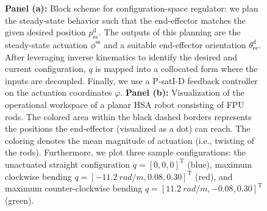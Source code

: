 \begin{figure}[ht]
    \centering
    \caption{\textbf{Panel (a):} Block scheme for configuration-space regulator: we plan the steady-state behavior such that the end-effector matches the given desired position $p_\mathrm{ee}^\mathrm{d}$. The outputs of this planning are the steady-state actuation $\phi^\mathrm{ss}$ and a suitable end-effector orientation $\theta_\mathrm{ee}^\mathrm{d}$. After leveraging inverse kinematics to identify the desired and current configuration, $q$ is mapped into a collocated form where the inputs are decoupled. Finally, we use a P-satI-D feedback controller on the actuation coordinates $\varphi$. \textbf{Panel (b):} Visualization of the operational workspace of a planar HSA robot consisting of FPU rods. The colored area within the black dashed borders represents the positions the end-effector (visualized as a dot) can reach. The coloring denotes the mean magnitude of actuation (i.e., twisting of the rods). Furthermore, we plot three sample configurations: the unactuated straight configuration $q = [0, 0, 0]^\mathrm{T}$ (blue), maximum clockwise bending $q = [\SI{-11.2}{rad \per m}, 0.08, 0.30]^\mathrm{T}$ (red), and maximum counter-clockwise bending $q = [\SI{11.2}{rad \per m}, -0.08, 0.30]^\mathrm{T}$ (green).}
\end{figure}

